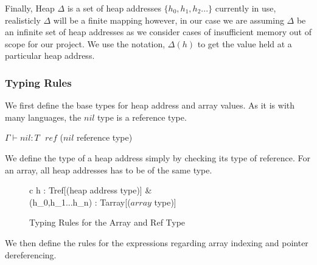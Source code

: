 \documentclass[a4paper,12pt]{report}
\begin{document}
\par
Finally, Heap $\Delta$ is a set of heap addresses $\{h_0, h_1, h_2...\}$ currently in use, 
realisticly $\Delta$ will be a finite mapping however, in our case we are assuming 
$\Delta$ be an infinite set of heap addresses as we consider cases of 
insufficient memory out of scope for our project. We use the notation, $\Delta(h)$ 
to get the value held at a particular heap address. 

\subsubsection{Typing Rules}

We first define the base types for heap address and array values. As it is with 
many languages, the $nil$ type is a reference type.
\begin{center}
   $\Gamma \vdash nil : T\text{ }ref$ ($nil$ reference type)
\end{center}

\par
We define the type of a heap address simply by checking its type of reference. 
For an array, all heap addresses has to be of the same type. 

\begin{figure}[H]
  \begin{center}
    \begin{tabular} {c}
        {\Gamma \vdash h : T\text{ }ref}[(heap address type)]
      & \\
        {\Gamma \vdash (h_0,h_1...h_n) : T\text{ }array}[($array$ type)] 
    \end{tabular}
  \end{center}
  \caption{Typing Rules for the Array and Ref Type}
\end{figure}

\par
We then define the rules for the expressions regarding array indexing and 
pointer dereferencing. 
\end{document}
